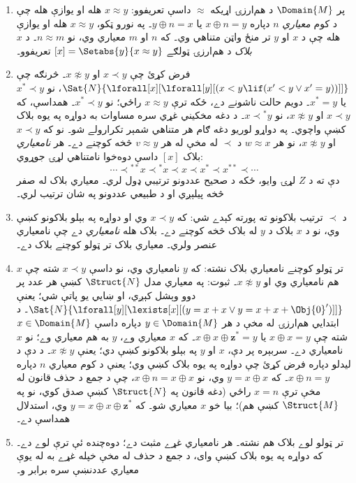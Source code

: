 \documentclass[../../../include/open-logic-section]{subfiles}
\begin{document}
\begin{enumerate}
\item پر $\Domain{M}$ د هم‌ارزۍ اړيکه $\approx$ داسې تعريفوو: $x \approx y$ هله او يوازې هله چې د کوم \emph{معياري} $n$ دپاره $x \oplus n = y$ يا $y \oplus n =x$۔ په نورو ټکو، $x \approx y$ هله او يوازې هله چې د $x$ او $y$ تر منځ واټن متناهي وي۔ که $n$ او $m$ معياري وي، نو $n \approx m$۔ د $x$ \emph{بلاک} د هم‌ارزۍ ټولګے $[x] = \Setabs{y}{x
  \approx y}$ تعريفوو۔
\item فرض کړئ چې $x \prec y$ او $x \not\approx y$۔ څرنګه چې $\Sat{N}{\lforall[x][\lforall[y][(x < y \lif (x' < y \lor x' =
      y))]]}$، نو $x^* \prec y$ يا $x^* = y$۔ دويم حالت ناشونے دے، ځکه ترې $x \approx y$ راځي؛ نو $x^* \prec y$۔ همداسې، که $x \prec y$ او $x \not\approx y$، نو $x \prec {^*y}$۔ د دغه مخکيني غړي سره مساوات به دواړه په يوه بلاک کښې واچوي۔ په دواړو لوريو دغه ګام هر متناهي شمېر تکرارولے شو۔ نو که $x \prec y$ او $x \not\approx y$، نو هر $w \approx x$ د $\prec$ له مخې له هر $v \approx y$ څخه کوچنے دے۔ هر \emph{نامعياري} بلاک $[x]$ داسې دوه‌خوا نامتناهي لړۍ جوړوي:
  \[
  \cdots \prec  {^{**}x} \prec {^*}x \prec x \prec x^* \prec x^{**}
  \prec \cdots
  \]
  دې ته د $Z$ لړۍ وايو، ځکه د صحيح عددونو ترتيبي ډول لري۔ معياري بلاک له صفر څخه پيلېږي او د طبيعي عددونو په شان ترتيب لري۔
\item د $\prec$ ترتيب بلاکونو ته پورته کېدے شي: که $x \prec y$ وي او دواړه په بېلو بلاکونو کښې وي، نو د $x$ بلاک د $y$ له بلاک څخه کوچنے دے۔ بلاک هله \emph{نامعياري} دے چې نامعياري عنصر ولري۔ معياري بلاک تر ټولو کوچنے بلاک دے۔
\item تر ټولو کوچنے نامعياري بلاک نشته: که $y$ نامعياري وي، نو داسې $x \prec y$ شته چې $x$ هم نامعياري وي او $x \not\approx y$۔ ثبوت: په معياري مدل $\Struct{N}$ کښې هر عدد پر دوو وېشل کېږي، او ښايي يو پاتې شي؛ يعنې
  $\Sat{N}{\lforall[y][\lexists[x][(y = x + x \lor y = x + x +
        \Obj{0}')]]}$۔ د ابتدايي هم‌ارزۍ له مخې د هر $y \in \Domain{M}$ دپاره داسې $x \in \Domain{M}$ شته چې $x \oplus x = y$ يا $x \oplus x \oplus \mathbf{z}^*= y$۔ که $x$ معياري وے، $y$ به هم معياري وے؛ نو $x$ نامعياري دے۔ سربېره پر دې، $x$ او $y$ په بېلو بلاکونو کښې دي؛ يعنې $x \not\approx y$۔ د دې د ليدلو دپاره فرض کړئ چې دواړه په يوه بلاک کښې وي؛ يعنې د کوم معياري $n$ دپاره $x \oplus n = y$۔ که $y = x \oplus x$ وي، نو $x \oplus n = x
  \oplus x$، چې د جمع د حذف قانون له مخې ترې $x = n$ راځي (دغه قانون په $\Struct{N}$ کښې صدق کوي، نو په $\Struct{M}$ کښې هم)؛ بيا خو $x$ معياري شو۔ که $y = x \oplus x \oplus \mathbf{z}^*$ وي، استدلال همداسې دے۔
\item تر ټولو لوے بلاک هم نشته۔ هر نامعياري غړے مثبت دے؛ دوه‌چنده ئې ترې لوے دے۔ که دواړه په يوه بلاک کښې وای، د جمع د حذف له مخې خپله غړے به له يوې معياري عددنښې سره برابر و۔

\end{enumerate}
\end{document}
